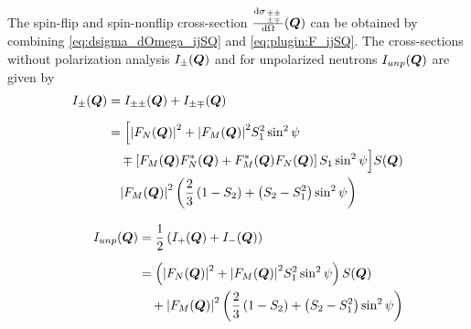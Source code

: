 The spin-flip and spin-nonflip cross-section
$\frac{\mathrm{d}\sigma_{{\pm\pm}\atop{\pm\mp}}}{\mathrm{d}\Omega}(\mbox{\boldmath$Q$})$
can be obtained by combining \ref{eq:dsigma_dOmega_ijSQ} and
\ref{eq:plugin:F_ijSQ}. The cross-sections without polarization
analysis $I_\pm(\mbox{\boldmath$Q$})$ and for unpolarized neutrons
$I_{unp}(\mbox{\boldmath$Q$})$ are given by
\begin{subequations} \label{eq:plugin:I_iSQ_I_unpSQ}
\begin{align}
\begin{split}
    I_{\pm}(\mbox{\boldmath$Q$}) &= I_{\pm\pm}(\mbox{\boldmath$Q$})+I_{\pm\mp}(\mbox{\boldmath$Q$}) \\[2mm]
                    &= \Bigl[{\left\vert F_N(\mbox{\boldmath$Q$})\right\vert}^2 + {\left\vert F_M(\mbox{\boldmath$Q$})\right\vert}^2S_1^2\sin^2\psi \\
                    & \quad  \mp \left[F_M(\mbox{\boldmath$Q$})F^*_N(\mbox{\boldmath$Q$})+F^*_M(\mbox{\boldmath$Q$})F_N(\mbox{\boldmath$Q$})\right]S_1\sin^2\psi\Bigr] S(\mbox{\boldmath$Q$}) \\
                    & \quad {\left\vert F_M(\mbox{\boldmath$Q$})\right\vert}^2\left(\frac{2}{3}\left(1-S_2\right)+\left(S_2-S_1^2\right)\sin^2\psi \right)
\end{split} \\[3mm]
\begin{split}
    I_{unp}(\mbox{\boldmath$Q$}) &= \frac{1}{2}\left(I_{+}(\mbox{\boldmath$Q$})+I_{-}(\mbox{\boldmath$Q$})\right)\\[2mm]
                    &=  \left({\left\vert F_N(\mbox{\boldmath$Q$})\right\vert}^2 + {\left\vert F_M(\mbox{\boldmath$Q$})\right\vert}^2S_1^2\sin^2\psi\right) S(\mbox{\boldmath$Q$}) \\
                    & \quad + {\left\vert F_M(\mbox{\boldmath$Q$})\right\vert}^2\left(\frac{2}{3}\left(1-S_2\right)+\left(S_2-S_1^2\right)\sin^2\psi\right)
\end{split}
\end{align}
\end{subequations}


